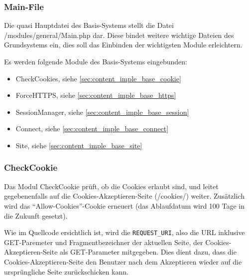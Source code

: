 \subsubsection{Main-File}
Die quasi Hauptdatei des Basis-Systems stellt die Datei /modules/general/Main.php dar. Diese bindet weitere wichtige Dateien des Grundsystems ein, dies soll das Einbinden der wichtigsten Module erleichtern.

Es werden folgende Module des Basis-Systems eingebunden:
\begin{itemize}
	\item CheckCookies, siehe \autoref{sec:content_imple_base_cookie}
	\item ForceHTTPS, siehe \autoref{sec:content_imple_base_https}
	\item SessionManager, siehe \autoref{sec:content_imple_base_session}
	\item Connect, siehe \autoref{sec:content_imple_base_connect}
	\item Site, siehe \autoref{sec:content_imple_base_site}
\end{itemize}

\subsubsection{CheckCookie}
\label{sec:content_imple_base_cookie}
Das Modul CheckCookie prüft, ob die Cookies erlaubt sind, und leitet gegebenenfalls auf die Cookies-Akzeptieren-Seite (/cookies/) weiter. Zusätzlich wird das \enquote{Allow-Cookies}-Cookie erneuert (das Ablaufdatum wird 100 Tage in die Zukunft gesetzt).

Wie im Quellcode ersichtlich ist, wird die \texttt{REQUEST\_URI}, also die URL inklusive GET-Paremeter und Fragmentbezeichner der aktuellen Seite, der Cookies-Akzeptieren-Seite als GET-Parameter mitgegeben. Dies dient dazu, dass die Cookies-Akzeptieren-Seite den Benutzer nach dem Akzeptieren wieder auf die ursprüngliche Seite zurückschicken kann.
%
%
% 
%
